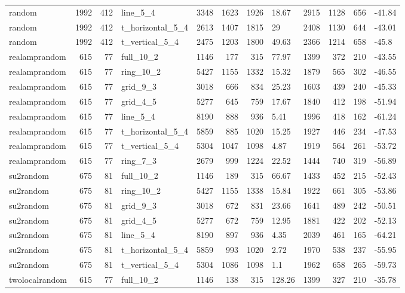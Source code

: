 \begin{longtable}{lrrlrrrlrrrl}
random & 1992 & 412 & line\_5\_4 & 3348 & 1623 & 1926 & 18.67 & 2915 & 1128 & 656 & -41.84 \\
random & 1992 & 412 & t\_horizontal\_5\_4 & 2613 & 1407 & 1815 & 29 & 2408 & 1130 & 644 & -43.01 \\
random & 1992 & 412 & t\_vertical\_5\_4 & 2475 & 1203 & 1800 & 49.63 & 2366 & 1214 & 658 & -45.8 \\
realamprandom & 615 & 77 & full\_10\_2 & 1146 & 177 & 315 & 77.97 & 1399 & 372 & 210 & -43.55 \\
realamprandom & 615 & 77 & ring\_10\_2 & 5427 & 1155 & 1332 & 15.32 & 1879 & 565 & 302 & -46.55 \\
realamprandom & 615 & 77 & grid\_9\_3 & 3018 & 666 & 834 & 25.23 & 1603 & 439 & 240 & -45.33 \\
realamprandom & 615 & 77 & grid\_4\_5 & 5277 & 645 & 759 & 17.67 & 1840 & 412 & 198 & -51.94 \\
realamprandom & 615 & 77 & line\_5\_4 & 8190 & 888 & 936 & 5.41 & 1996 & 418 & 162 & -61.24 \\
realamprandom & 615 & 77 & t\_horizontal\_5\_4 & 5859 & 885 & 1020 & 15.25 & 1927 & 446 & 234 & -47.53 \\
realamprandom & 615 & 77 & t\_vertical\_5\_4 & 5304 & 1047 & 1098 & 4.87 & 1919 & 564 & 261 & -53.72 \\
realamprandom & 615 & 77 & ring\_7\_3 & 2679 & 999 & 1224 & 22.52 & 1444 & 740 & 319 & -56.89 \\
su2random & 675 & 81 & full\_10\_2 & 1146 & 189 & 315 & 66.67 & 1433 & 452 & 215 & -52.43 \\
su2random & 675 & 81 & ring\_10\_2 & 5427 & 1155 & 1338 & 15.84 & 1922 & 661 & 305 & -53.86 \\
su2random & 675 & 81 & grid\_9\_3 & 3018 & 672 & 831 & 23.66 & 1641 & 489 & 242 & -50.51 \\
su2random & 675 & 81 & grid\_4\_5 & 5277 & 672 & 759 & 12.95 & 1881 & 422 & 202 & -52.13 \\
su2random & 675 & 81 & line\_5\_4 & 8190 & 897 & 936 & 4.35 & 2039 & 461 & 165 & -64.21 \\
su2random & 675 & 81 & t\_horizontal\_5\_4 & 5859 & 993 & 1020 & 2.72 & 1970 & 538 & 237 & -55.95 \\
su2random & 675 & 81 & t\_vertical\_5\_4 & 5304 & 1086 & 1098 & 1.1 & 1962 & 658 & 265 & -59.73 \\
twolocalrandom & 615 & 77 & full\_10\_2 & 1146 & 138 & 315 & 128.26 & 1399 & 327 & 210 & -35.78 \\

\end{longtable}

